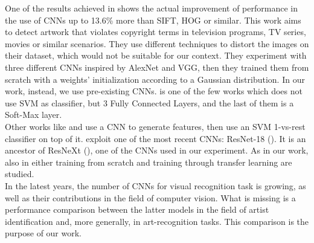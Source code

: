 \documentclass{article}
\begin{document}
One of the results achieved in \cite{hong2017} shows the actual improvement of performance in the use of CNNs up to 13.6\% more than SIFT, HOG or similar.  This work aims to detect artwork that violates copyright terms in television programs, TV series, movies or similar scenarios. They use different techniques to distort the images on their dataset, which would not be suitable for our context. They experiment with three different CNNs inspired by AlexNet and VGG, then they trained them from scratch with a weights' initialization according to a Gaussian distribution. In our work, instead, we use pre-existing CNNs. \cite{hong2017} is one of the few works which does not use SVM as classifier, but 3 Fully Connected Layers, and the last of them is a Soft-Max layer.\\
Other works like \cite{Bar2014} and \cite{razavian2014} use a CNN to generate features, then use an SVM 1-vs-rest classifier on top of it.
\cite{ArtistIdCNN406} exploit one of the most recent CNNs: ResNet-18 (\cite{resnet}). It is an ancestor of ResNeXt (\cite{resneXt}), one of the CNNs used in our experiment. As in our work, also in \cite{ArtistIdCNN406} either training from scratch and training through transfer learning are studied.
\\

In the latest years, the number of CNNs for visual recognition task is growing, as well as their contributions in the field of computer vision. What is missing is a performance comparison between the latter models in the field of artist identification and, more generally, in art-recognition tasks. This comparison is the purpose of our work.
\end{document}
